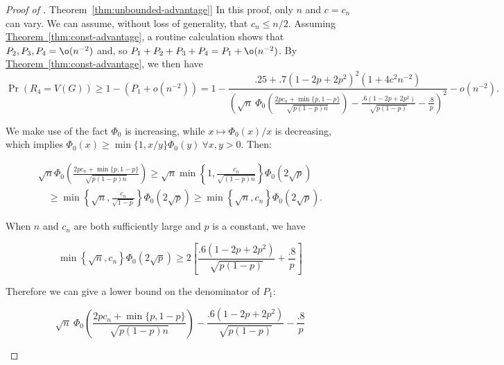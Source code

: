 \documentclass[11pt]{article}
\numberwithin{equation}{section}
\theoremstyle{definition}
\theoremstyle{plain}
\newcommand{\expref}[2]{\hyperref[#2]{#1~\ref{#2}}}
\begin{document}
			\begin{proof}[Proof of \expref{Theorem}{thm:unbounded-advantage}]
				In this proof, only $n$ and $c =c_n$ can vary. We can assume, without loss of generality, that $c_n \le n/2$.
				Assuming \expref{Theorem}{thm:const-advantage},
				a routine calculation shows that $P_2, P_3, P_4 = \o(n^{-2})$ and, so $P_1 + P_2 + P_3 + P_4 = P_1 + \o(n^{-2})$.
				By \expref{Theorem}{thm:const-advantage}, we then have
				\[
				\Pr(R_4 = V(G)) \ge 1 - (P_1 + o(n^{-2}))
				= 1 - \frac{.25 + .7(1 - 2p + 2p^2)^2 \left(1 + 4c^2n^{-2}\right)}{\left(\sqrt{n}\ \Phi_0 \left( \frac{2pc_n  %
						+ \min\{p, 1 - p\}  %
					}{\sqrt{p(1 - p)n}} \right) - \frac{.6(1 - 2p + 2p^2)}{\sqrt{p(1 - p)}}- \frac{.8}{p}\right)^2} - o(n^{-2}).
				\]
				
				We make use of the fact $\Phi_0$ is increasing, while $x\mapsto \Phi_0(x)/x$ is decreasing,
				which implies $\Phi_0(x) \ge \min\{1, x/y\}\Phi_0(y) \ \forall x, y > 0$.
				Then:
				\begin{linenomath}\begin{equation*}
						\begin{aligned}
							\sqrt{n}\Phi_0\left(\frac{2pc_n  %
								+ \min\{p, 1 - p\}  %
							}{\sqrt{p(1 - p)n}}\right)
							\ge \sqrt{n}\min\left\{1, \frac{c_n}{\sqrt{(1 - p)n}} \right\} \Phi_0\left(2\sqrt{p}\right) \\
							\quad \ge \min\left\{\sqrt{n}, \frac{c_n}{\sqrt{1 - p}} \right\} \Phi_0\left(2\sqrt{p}\right)
							\ge \min\left\{\sqrt{n}, c_n \right\} \Phi_0\left(2\sqrt{p}\right).
						\end{aligned}
				\end{equation*}\end{linenomath}
				When $n$ and $c_n$ are both sufficiently large and $p$ is a constant, we have
				\begin{linenomath}\begin{equation*}
						\min\left\{\sqrt{n}, c_n \right\} \Phi_0\left(2\sqrt{p}\right) \ge 2\left[\frac{.6(1 - 2p + 2p^2)}{\sqrt{p(1 - p)}} + \frac{.8}{p} \right]
				\end{equation*}\end{linenomath}
				Therefore we can %
				give a lower bound on %
				the denominator of $P_1$:
				\begin{linenomath}\begin{equation*}
						\sqrt{n}\ \Phi_0 \left( \frac{2pc_n  %
							+ \min\{p, 1 - p\}  %
						}{\sqrt{p(1 - p)n}} \right) - \frac{.6(1 - 2p + 2p^2)}{\sqrt{p(1 - p)}}- \frac{.8}{p}

\end{equation*}
\end{linenomath}
\end{proof}
\end{document}
